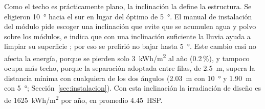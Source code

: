 Como el techo es prácticamente plano, la inclinación la define la estructura. Se eligieron \SI{10}{\degree} hacia el sur en lugar del óptimo de \SI{5}{\degree}. El manual de instalación del módulo pide escoger una inclinación que evite que se acumulen agua y polvo sobre los módulos, e indica que con una inclinación suficiente la lluvia ayuda a limpiar su superficie \cite{aiko_manual}; por eso se prefirió no bajar hasta \SI{5}{\degree}. Este cambio casi no afecta la energía, porque se pierden solo \SI{3}{kWh/m^2} al año (0.2\,\%), y tampoco ocupa más techo, porque la separación adoptada entre filas, de \SI{2.5}{m}, supera la distancia mínima con cualquiera de los dos ángulos (\SI{2.03}{m} con \SI{10}{\degree} y \SI{1.90}{m} con \SI{5}{\degree}; Sección~\ref{sec:instalacion}). Con esta inclinación la irradiación de diseño es de \SI{1625}{kWh/m^2} por año, en promedio \SI{4.45}{HSP}.
